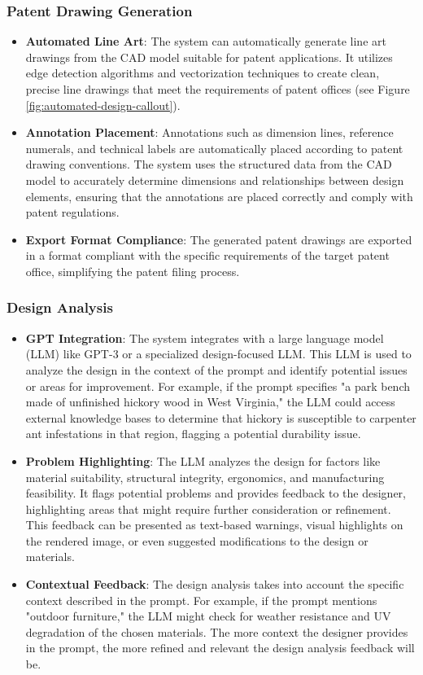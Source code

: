 \documentclass[12pt]{report}
\begin{document}
\subsubsection{Patent Drawing Generation}
\begin{itemize}
\item \textbf{Automated Line Art}: The system can automatically generate line art drawings from the CAD model suitable for patent applications. It utilizes edge detection algorithms and vectorization techniques to create clean, precise line drawings that meet the requirements of patent offices (see Figure \ref{fig:automated-design-callout}).
\item \textbf{Annotation Placement}: Annotations such as dimension lines, reference numerals, and technical labels are automatically placed according to patent drawing conventions. The system uses the structured data from the CAD model to accurately determine dimensions and relationships between design elements, ensuring that the annotations are placed correctly and comply with patent regulations.
\item \textbf{Export Format Compliance}: The generated patent drawings are exported in a format compliant with the specific requirements of the target patent office, simplifying the patent filing process.
\end{itemize}


\subsubsection{Design Analysis}
\begin{itemize}
\item \textbf{GPT Integration}: The system integrates with a large language model (LLM) like GPT-3 or a specialized design-focused LLM. This LLM is used to analyze the design in the context of the prompt and identify potential issues or areas for improvement. For example, if the prompt specifies "a park bench made of unfinished hickory wood in West Virginia," the LLM could access external knowledge bases to determine that hickory is susceptible to carpenter ant infestations in that region, flagging a potential durability issue.
\item \textbf{Problem Highlighting}: The LLM analyzes the design for factors like material suitability, structural integrity, ergonomics, and manufacturing feasibility. It flags potential problems and provides feedback to the designer, highlighting areas that might require further consideration or refinement. This feedback can be presented as text-based warnings, visual highlights on the rendered image, or even suggested modifications to the design or materials.
\item \textbf{Contextual Feedback}: The design analysis takes into account the specific context described in the prompt. For example, if the prompt mentions "outdoor furniture," the LLM might check for weather resistance and UV degradation of the chosen materials. The more context the designer provides in the prompt, the more refined and relevant the design analysis feedback will be.
\end{itemize}
\end{document}

